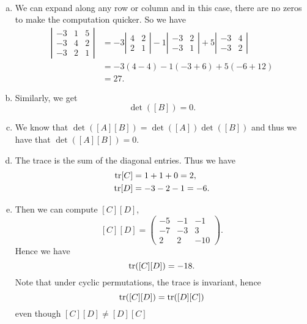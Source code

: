 \documentclass[12pt]{article} %
\begin{document}
\begin{solution}~
\begin{enumerate}[(a)]
    \item We can expand along any row or column and in this case, there are no zeros to make the computation quicker. So we have
    \begin{align*}
        \left| \begin{matrix} -3 & 1 & 5 \\ -3 & 4 & 2 \\ -3 & 2 & 1 \end{matrix} \right| &= -3 \left| \begin{matrix} 4 & 2 \\ 2 & 1 \end{matrix} \right| -1 \left| \begin{matrix} -3 & 2 \\ -3 & 1 \end{matrix} \right| +5 \left| \begin{matrix} -3 & 4 \\ -3 & 2 \end{matrix} \right|\\
        &= -3(4-4)-1(-3+6)+5(-6+12)\\
        &= 27.
    \end{align*}
    \item Similarly, we get
    \[
    \det([B])= 0.
    \]
    \item We know that $\det([A][B])=\det([A])\det([B])$ and thus we have that $\det([A][B])=0.$
    \item The trace is the sum of the diagonal entries. Thus we have
    \begin{align*}
        \mathrm{tr}[C]&=1+1+0=2,\\
        \mathrm{tr}[D]&=-3-2-1=-6.
    \end{align*}
    \item Then we can compute $[C][D]$,
    \[
    [C][D]=\begin{pmatrix}
    -5 & -1 & -1 \\ -7 & -3 & 3 \\ 2 & 2 & -10
    \end{pmatrix}.
    \]
    Hence we have
    \[
    \mathrm{tr}([C][D]) = -18.
    \]
    Note that under cyclic permutations, the trace is invariant, hence
    \[
    \mathrm{tr}([C][D])=\mathrm{tr}([D][C])
    \]
    even though $[C][D]\neq [D][C]$

\end{enumerate}
\end{solution}
\end{document}
